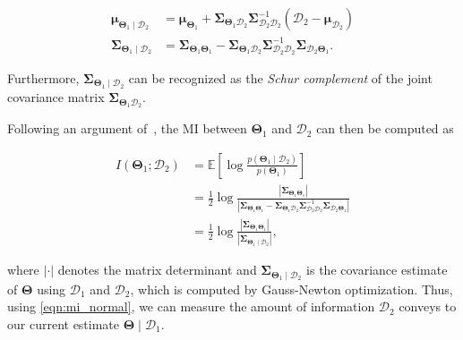 \begin{equation}\label{eqn:joint_conditional}
  \begin{aligned}
  \boldsymbol{\mu}_{\boldsymbol{\Theta}_1\mid\mathcal{D}_2} &=
    \boldsymbol{\mu}_{\boldsymbol{\Theta}_1} +
    \boldsymbol{\Sigma}_{\boldsymbol{\Theta}_1\mathcal{D}_2}
    \boldsymbol{\Sigma}_{\mathcal{D}_2\mathcal{D}_2}^{-1}
    (\mathcal{D}_2 - \boldsymbol{\mu}_{\mathcal{D}_2})\\
  \boldsymbol{\Sigma}_{\boldsymbol{\Theta}_1\mid\mathcal{D}_2} &=
    \boldsymbol{\Sigma}_{\boldsymbol{\Theta}_1\boldsymbol{\Theta}_1} -
    \boldsymbol{\Sigma}_{\boldsymbol{\Theta}_1\mathcal{D}_2}
    \boldsymbol{\Sigma}_{\mathcal{D}_2\mathcal{D}_2}^{-1}
    \boldsymbol{\Sigma}_{\mathcal{D}_2\boldsymbol{\Theta}_1}.
  \end{aligned}
\end{equation}

\noindent Furthermore,
$\boldsymbol{\Sigma}_{\boldsymbol{\Theta}_1\mid\mathcal{D}_2}$ can
be recognized as the \emph{Schur complement} of the joint covariance matrix
$\boldsymbol{\Sigma}_{\boldsymbol{\Theta}_1\mathcal{D}_2}$.

Following an argument of~\cite{davison05active}, the MI between
$\mathbf{\Theta}_1$ and $\mathcal{D}_2$ can then be computed as

\begin{equation}\label{eqn:mi_normal}
  \begin{aligned}
  I(\mathbf{\Theta}_1;\mathcal{D}_2) &=
    \mathbb{E}\left[\log
    \frac{p(\mathbf{\Theta}_1\mid\mathcal{D}_2)}{p(\mathbf{\Theta}_1)}\right]\\
    &= \frac{1}{2}\log\frac{|\boldsymbol{\Sigma}_{\boldsymbol{\Theta}_1
    \boldsymbol{\Theta}_1}|}
    {|\boldsymbol{\Sigma}_{\boldsymbol{\Theta}_1\boldsymbol{\Theta}_1} -
    \boldsymbol{\Sigma}_{\boldsymbol{\Theta}_1\mathcal{D}_2}
    \boldsymbol{\Sigma}_{\mathcal{D}_2\mathcal{D}_2}^{-1}
    \boldsymbol{\Sigma}_{\mathcal{D}_2\boldsymbol{\Theta}_1}|}\\
    &= \frac{1}{2}\log\frac{|\boldsymbol{\Sigma}_{\boldsymbol{\Theta}_1
    \boldsymbol{\Theta}_1}|}
    {|\boldsymbol{\Sigma}_{\boldsymbol{\Theta}_1\mid\mathcal{D}_2}|},
  \end{aligned}
\end{equation}

\noindent where $|\cdot|$ denotes the matrix determinant and
$\boldsymbol{\Sigma}_{\boldsymbol{\Theta}_1\mid\mathcal{D}_2}$ is the covariance
estimate of $\boldsymbol{\Theta}$ using $\mathcal{D}_1$ and $\mathcal{D}_2$,
which is computed by Gauss-Newton optimization. Thus, using
\eqref{eqn:mi_normal}, we can measure the amount of information
$\mathcal{D}_2$ conveys to our current estimate
$\boldsymbol{\Theta}\mid\mathcal{D}_1$.

